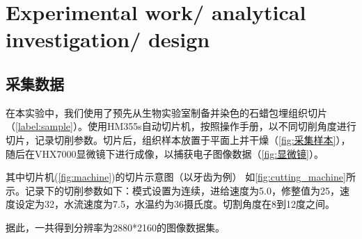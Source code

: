\section{Experimental work/ analytical investigation/ design}


\subsection{采集数据}
在本实验中，我们使用了预先从生物实验室制备并染色的石蜡包埋组织切片（\ref{label:sample}）。使用HM355s自动切片机，按照操作手册，以不同切削角度进行切片，记录切削参数。切片后，组织样本放置于平面上并干燥（\ref{fig:采集样本}），随后在VHX7000显微镜下进行成像，以捕获电子图像数据（\ref{fig:显微镜}）。

其中切片机(\autoref{fig:machine})的切片示意图（以牙齿为例） 如\autoref{fig:cutting_machine}所示\cite{4.1}。记录下的切削参数如下：模式设置为连续，进给速度为5.0，修整值为25，速度设定为32，水流速度为7.5，水温约为36摄氏度。切割角度在8到12度之间。

据此，一共得到分辨率为2880*2160的图像数据集。


